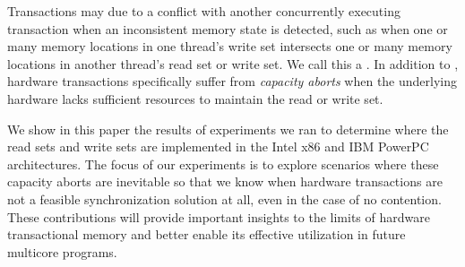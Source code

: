 Transactions may  due to a conflict with
another concurrently executing transaction when an
inconsistent memory state is detected, 
such as when one or many memory locations
in one thread's write set intersects one or 
many memory locations in another
thread's read set or write set.  We call this a
.  In addition to ,
hardware transactions specifically suffer 
from \textit{capacity aborts} when the underlying hardware
lacks sufficient resources to maintain the
read or write set.

We show in this paper the results of experiments 
we ran to determine where the
read sets and write sets are implemented in the 
Intel x86 and IBM PowerPC
architectures. The focus of our experiments is to 
explore scenarios where these
capacity aborts are inevitable so that we know 
when hardware transactions are
not a feasible synchronization solution at all, 
even in the case of no
contention. These contributions will provide 
important insights to the limits of
hardware transactional memory and better enable 
its effective utilization in
future multicore programs.
 
